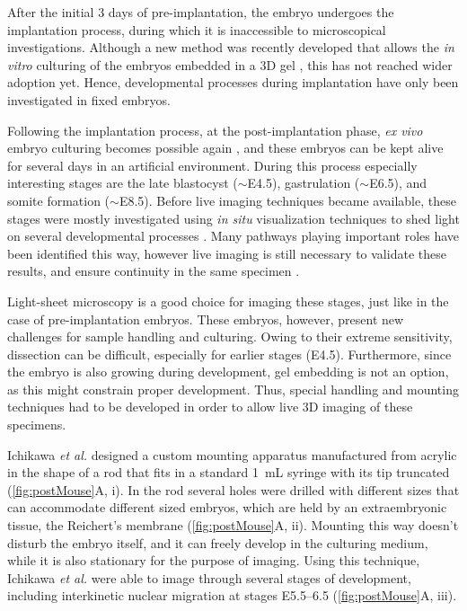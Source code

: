     After the initial 3 days of pre-implantation, the embryo undergoes the implantation process, during which it is inaccessible to microscopical investigations. Although a new method was recently developed that allows the \textit{in vitro} culturing of the embryos embedded in a 3D gel \cite{panavaite_3d-geec:_2017}, this has not reached wider adoption yet. Hence, developmental processes during implantation have only been investigated in fixed embryos.
    
    Following the implantation process, at the post-implantation phase, \textit{ex vivo} embryo culturing becomes possible again \cite{hsu_vitro_1979, huang_effect_2001}, and these embryos can be kept alive for several days in an artificial environment. During this process especially interesting stages are the late blastocyst ($\sim$E4.5), gastrulation ($\sim$E6.5), and somite formation ($\sim$E8.5). Before live imaging techniques became available, these stages were mostly investigated using \textit{in situ} visualization techniques to shed light on several developmental processes \cite{nowotschin_cellular_2010}. Many pathways playing important roles have been identified this way, however live imaging is still necessary to validate these results, and ensure continuity in the same specimen \cite{garcia_live_2011}.

    Light-sheet microscopy is a good choice for imaging these stages, just like in the case of pre-implantation embryos. These embryos, however, present new challenges for sample handling and culturing. Owing to their extreme sensitivity, dissection can be difficult, especially for earlier stages (E4.5). Furthermore, since the embryo is also growing during development, gel embedding is not an option, as this might constrain proper development. Thus, special handling and mounting techniques had to be developed in order to allow live 3D imaging of these specimens.

    Ichikawa \textit{et al.} \cite{ichikawa_live_2013} designed a custom mounting apparatus manufactured from acrylic in the shape of a rod that fits in a standard \SI{1}{mL} syringe with its tip truncated (\autoref{fig:postMouse}A, i). In the rod several holes were drilled with different sizes that can accommodate different sized embryos, which are held by an extraembryonic tissue, the Reichert's membrane (\autoref{fig:postMouse}A, ii). Mounting this way doesn't disturb the embryo itself, and it can freely develop in the culturing medium, while it is also stationary for the purpose of imaging. Using this technique, Ichikawa \textit{et al.} were able to image through several stages of development, including interkinetic nuclear migration at stages E5.5--6.5 (\autoref{fig:postMouse}A, iii).

